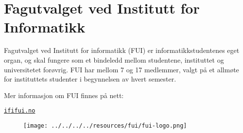 \section{Fagutvalget ved Institutt for Informatikk}
Fagutvalget ved Institutt for informatikk (FUI) er informatikkstudentenes eget organ, og skal
fungere som et bindeledd mellom studentene, instituttet og universitetet forøvrig. FUI har mellom 7 og 17 medlemmer, valgt på et allmøte for instituttets studenter i begynnelsen av hvert semester.

Mer informasjon om FUI finnes på nett:
\begin{center}
\href{http://ififui.no/}{\texttt{ififui.no}}
\end{center}

\begin{figure}[H]
\begin{center}
\texttt{[image: ../../../../resources/fui/fui-logo.png]}
\end{center}
\end{figure}


